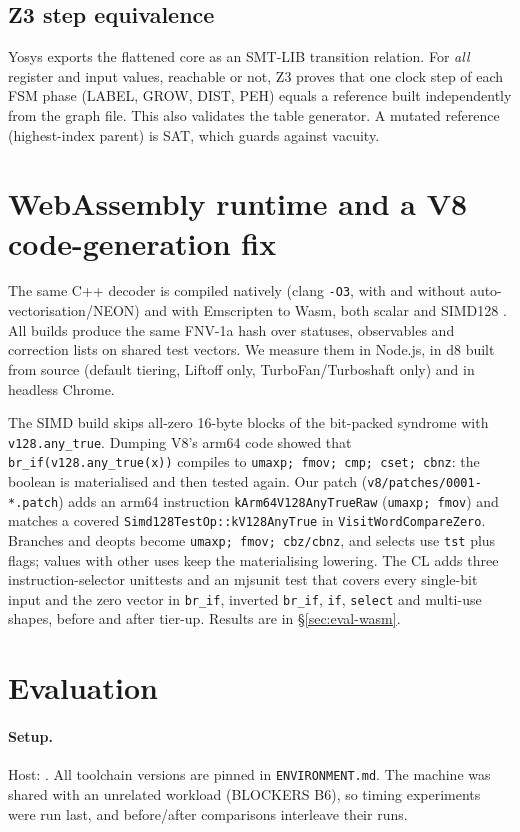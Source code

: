 \documentclass[10pt]{article}
\begin{document}
\subsection{Z3 step equivalence}
Yosys exports the flattened core as an SMT-LIB transition relation. For \emph{all} register and input values,
reachable or not, Z3 \cite{demoura2008z3} proves that one clock step of each FSM phase (LABEL, GROW, DIST, PEH)
equals a reference built independently from the graph file. This also validates the table generator. A
mutated reference (highest-index parent) is SAT, which guards against vacuity.



\section{WebAssembly runtime and a V8 code-generation fix}\label{sec:wasm}
The same C++ decoder is compiled natively (clang \texttt{-O3}, with and without auto-vectorisation/NEON) and
with Emscripten to Wasm, both scalar and SIMD128 \cite{haas2017wasm,jangda2019notsofast}. All builds produce the
same FNV-1a hash over statuses, observables and correction lists on shared test vectors. We measure them in
Node.js, in d8 built from source (default tiering, Liftoff only, TurboFan/Turboshaft only) and in headless
Chrome.

The SIMD build skips all-zero 16-byte blocks of the bit-packed syndrome with \texttt{v128.any\_true}.
Dumping V8's arm64 code showed that \texttt{br\_if(v128.any\_true(x))} compiles to
\texttt{umaxp; fmov; cmp; cset; cbnz}: the boolean is materialised and then tested again. Our patch
(\texttt{v8/patches/0001-*.patch}) adds an arm64 instruction \texttt{kArm64V128AnyTrueRaw}
(\texttt{umaxp; fmov}) and matches a covered \texttt{Simd128TestOp::kV128AnyTrue} in
\texttt{VisitWordCompareZero}. Branches and deopts become \texttt{umaxp; fmov; cbz/cbnz}, and selects use
\texttt{tst} plus flags; values with other uses keep the materialising lowering. The CL adds three
instruction-selector unittests and an mjsunit test that covers every single-bit input and the zero vector
in \texttt{br\_if}, inverted \texttt{br\_if}, \texttt{if}, \texttt{select} and multi-use shapes, before and
after tier-up. Results are in \S\ref{sec:eval-wasm}.

\section{Evaluation}\label{sec:eval}
\paragraph{Setup.} Host: . All toolchain versions are pinned in \texttt{ENVIRONMENT.md}.
The machine was shared with an unrelated workload (BLOCKERS B6), so timing experiments were run last, and
before/after comparisons interleave their runs.
\end{document}
